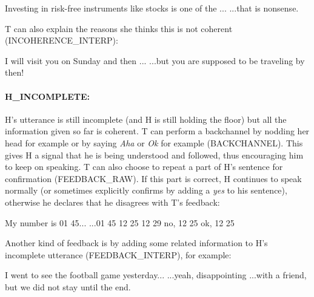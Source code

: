 						\begin{dialogue}
							 Investing in risk-free instruments like stocks is one of the ...
							 ...that is nonsense.
						\end{dialogue}
						
						T can also explain the reasons she thinks this is not coherent (INCOHERENCE\_INTERP):
						
						\begin{dialogue}
							 I will visit you on Sunday and then ...
							 ...but you are supposed to be traveling by then!
						\end{dialogue}
						
					\paragraph{H\_INCOMPLETE:} H's utterance is still incomplete (and H is still holding the floor) but all the information given so far is coherent. T can perform a backchannel by nodding her head for example or by saying \textit{Aha} or \textit{Ok} for example (BACKCHANNEL). This gives H a signal that he is being understood and followed, thus encouraging him to keep on speaking. T can also choose to repeat a part of H's sentence for confirmation (FEEDBACK\_RAW). If this part is correct, H continues to speak normally (or sometimes explicitly confirms by adding a \textit{yes} to his sentence), otherwise he declares that he disagrees with T's feedback:
					
						\begin{dialogue}
							 My number is 01 45...
							\speak{T} ...01 45
							\speak{H} 12 25
							\speak{T} 12 29
							\speak{H} no, 12 25
							\speak{T} ok, 12 25
						\end{dialogue}
						
						Another kind of feedback is by adding some related information to H's incomplete utterance (FEEDBACK\_INTERP), for example:
						
						\begin{dialogue}
							 I went to see the football game yesterday...
							 ...yeah, disappointing
							 ...with a friend, but we did not stay until the end.
						\end{dialogue}
                        
